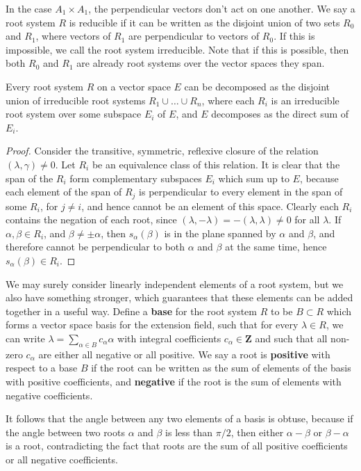 In the case $A_1 \times A_1$, the perpendicular vectors don't act on one another. We say a root system $R$ is reducible if it can be written as the disjoint union of two sets $R_0$ and $R_1$, where vectors of $R_1$ are perpendicular to vectors of $R_0$. If this is impossible, we call the root system irreducible. Note that if this is possible, then both $R_0$ and $R_1$ are already root systems over the vector spaces they span.

\begin{lemma}
    Every root system $R$ on a vector space $E$ can be decomposed as the disjoint union of irreducible root systems $R_1 \cup \dots \cup R_n$, where each $R_i$ is an irreducible root system over some subspace $E_i$ of $E$, and $E$ decomposes as the direct sum of $E_i$.
\end{lemma}
\begin{proof}
    Consider the transitive, symmetric, reflexive closure of the relation $(\lambda, \gamma) \neq 0$. Let $R_i$ be an equivalence class of this relation. It is clear that the span of the $R_i$ form complementary subspaces $E_i$ which sum up to $E$, because each element of the span of $R_j$ is perpendicular to every element in the span of some $R_i$, for $j \neq i$, and hence cannot be an element of this space. Clearly each $R_i$ contains the negation of each root, since $(\lambda, -\lambda) = - (\lambda, \lambda) \neq 0$ for all $\lambda$. If $\alpha, \beta \in R_i$, and $\beta \neq \pm \alpha$, then $s_\alpha(\beta)$ is in the plane spanned by $\alpha$ and $\beta$, and therefore cannot be perpendicular to both $\alpha$ and $\beta$ at the same time, hence $s_\alpha(\beta) \in R_i$.
\end{proof}

We may surely consider linearly independent elements of a root system, but we also have something stronger, which guarantees that these elements can be added together in a useful way. Define a {\bf base} for the root system $R$ to be $B \subset R$ which forms a vector space basis for the extension field, such that for every $\lambda \in R$, we can write $\lambda = \sum_{\alpha \in B} c_\alpha \alpha$ with integral coefficients $c_\alpha \in \mathbf{Z}$ and such that all non-zero $c_\alpha$ are either all negative or all positive. We say a root is {\bf positive} with respect to a base $B$ if the root can be written as the sum of elements of the basis with positive coefficients, and {\bf negative} if the root is the sum of elements with negative coefficients.

It follows that the angle between any two elements of a basis is obtuse, because if the angle between two roots $\alpha$ and $\beta$ is less than $\pi/2$, then either $\alpha - \beta$ or $\beta - \alpha$ is a root, contradicting the fact that roots are the sum of all positive coefficients or all negative coefficients.

